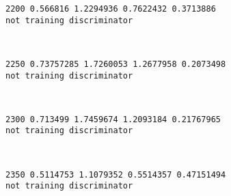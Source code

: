 \documentclass[11pt]{article}
\begin{document}
    \begin{Verbatim}[commandchars=\\\{\}]
2200 0.566816 1.2294936 0.7622432 0.3713886
not training discriminator

    \end{Verbatim}

    \begin{center}
    \end{center}
    { \hspace*{\fill} \\}
    
    \begin{Verbatim}[commandchars=\\\{\}]
2250 0.73757285 1.7260053 1.2677958 0.2073498
not training discriminator

    \end{Verbatim}

    \begin{center}
    \end{center}
    { \hspace*{\fill} \\}
    
    \begin{Verbatim}[commandchars=\\\{\}]
2300 0.713499 1.7459674 1.2093184 0.21767965
not training discriminator

    \end{Verbatim}

    \begin{center}
    \end{center}
    { \hspace*{\fill} \\}
    
    \begin{Verbatim}[commandchars=\\\{\}]
2350 0.5114753 1.1079352 0.5514357 0.47151494
not training discriminator

    \end{Verbatim}

    \begin{center}
    \end{center}
    { \hspace*{\fill} \\}
    
\end{document}
